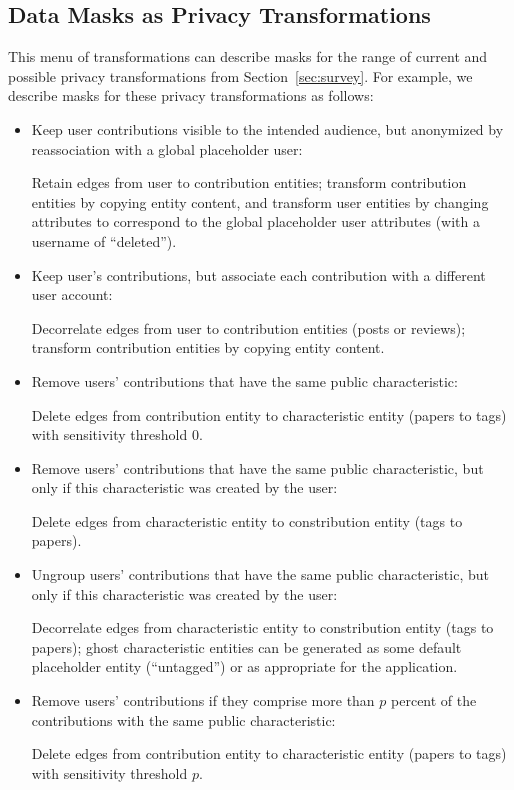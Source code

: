 \subsection{Data Masks as Privacy Transformations}
This menu of transformations can describe masks for the range of current and possible privacy
transformations from Section~\ref{sec:survey}. For example, we describe masks for these privacy
transformations as follows:
\begin{itemize}[nosep]
    \item Keep user contributions visible to the intended audience, but anonymized by reassociation with a global
        placeholder user:

        Retain edges from user to contribution entities; transform contribution entities by copying
        entity content, and transform user entities by changing attributes to correspond to the
        global placeholder user attributes (\eg with a username of ``deleted'').

    \item Keep user's contributions, but associate each contribution with a different user account:

        Decorrelate edges from user to contribution entities (\eg posts or reviews);
        transform contribution entities by copying entity
        content. 

    \item Remove users' contributions that have the same public characteristic: 

        Delete edges from
        contribution entity to characteristic entity (\eg papers to tags) with sensitivity threshold
        0.

    \item Remove users' contributions that have the same public characteristic, but only if this
        characteristic was created by the user: 

        Delete edges from characteristic entity to constribution entity (\eg tags to papers).

    \item Ungroup users' contributions that have the same public characteristic, but only if this
        characteristic was created by the user: 

        Decorrelate edges from characteristic entity to constribution entity (\eg tags to papers);
        ghost characteristic entities can be generated as some default placeholder entity (\eg ``untagged'') or
        as appropriate for the application.

    \item Remove users' contributions if they comprise more than $p$
            percent of the contributions with the same public characteristic:
        
        Delete edges from contribution entity to
        characteristic entity (\eg papers to tags) with sensitivity threshold $p$.
\end{itemize}

